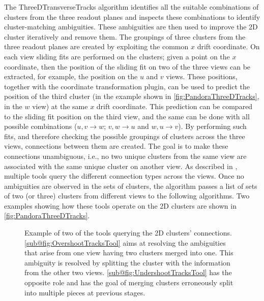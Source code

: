 The ThreeDTransverseTracks algorithm identifies all the suitable combinations of clusters from the three readout planes and inspects these combinations to identify cluster-matching ambiguities. These ambiguities are then used to improve the 2D cluster iteratively and remove them. The groupings of three clusters from the three readout planes are created by exploiting the common $x$ drift coordinate. On each view sliding fits are performed on the clusters; given a point on the $x$ coordinate, then the position of the sliding fit on two of the three views can be extracted, for example, the position on the $u$ and $v$ views. These positions, together with the coordinate transformation plugin, can be used to predict the position of the third cluster (in the example shown in \autoref{fig:PandoraThreeDTracks}, in the $w$ view) at the same $x$ drift coordinate. This prediction can be compared to the sliding fit position on the third view, and the same can be done with all possible combinations ($u,v\to w$; $v,w\to u$ and $w, u \to v$). By performing such fits, and therefore checking the possible groupings of clusters across the three views, connections between them are created. The goal is to make these connections unambiguous, i.e., no two unique clusters from the same view are associated with the same unique cluster on another view. As described in \cite{MicroBooNE:2017xvs}, multiple tools query the different connection types across the views. Once no ambiguities are observed in the sets of clusters, the algorithm passes a list of sets of two (or three) clusters from different views to the following algorithms. Two examples showing how these tools operate on the 2D clusters are shown in \autoref{fig:PandoraThreeDTracks}. 

\begin{figure}
    \centering
    \caption[Three-dimensional reconstruction helper tools]{Example of two of the tools querying the 2D clusters' connections. \ref{sub@fig:OvershootTracksTool} aims at resolving the ambiguities that arise from one view having two clusters merged into one. This ambiguity is resolved by splitting the cluster with the information from the other two views. \ref{sub@fig:UndershootTracksTool} has the opposite role and has the goal of merging clusters erroneously split into multiple pieces at previous stages. }
    \label{fig:PandoraThreeDTracks}
\end{figure}

